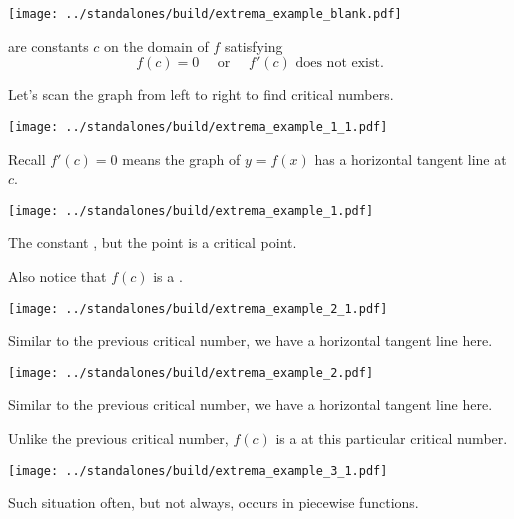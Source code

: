 \documentclass[12pt, handout]{beamer}
\begin{document}
 
\begin{frame}[t]
  \texttt{[image: ../standalones/build/extrema\_example\_blank.pdf]}

   are constants \(c\) on the domain of \(f\) satisfying
  \[
    f(c) = 0 \quad\text{ or }\quad f'(c) \text{ does not exist}.
  \]

  Let's scan the graph from left to right to find critical numbers.
\end{frame}

\begin{frame}[t]
  \texttt{[image: ../standalones/build/extrema\_example\_1\_1.pdf]}

  Recall \(f'(c) = 0\) means the graph of \(y = f(x)\) has a horizontal tangent line at \(c\).
\end{frame}

\begin{frame}[t]
  \texttt{[image: ../standalones/build/extrema\_example\_1.pdf]}
  
  \pause
  The constant , but the point  is a critical point.

  Also notice that \(f(c)\) is a .
\end{frame}

\begin{frame}[t]
  \texttt{[image: ../standalones/build/extrema\_example\_2\_1.pdf]}

  Similar to the previous critical number, we have a horizontal tangent line here.
\end{frame}

\begin{frame}[t]
  \texttt{[image: ../standalones/build/extrema\_example\_2.pdf]}
  
  Similar to the previous critical number, we have a horizontal tangent line here.
  \pause

  Unlike the previous critical number, \(f(c)\) is a  at this particular critical number.
\end{frame}


\begin{frame}[t]
  \texttt{[image: ../standalones/build/extrema\_example\_3\_1.pdf]}

  Such situation often, but not always, occurs in piecewise functions.
\end{frame}
\end{document}

